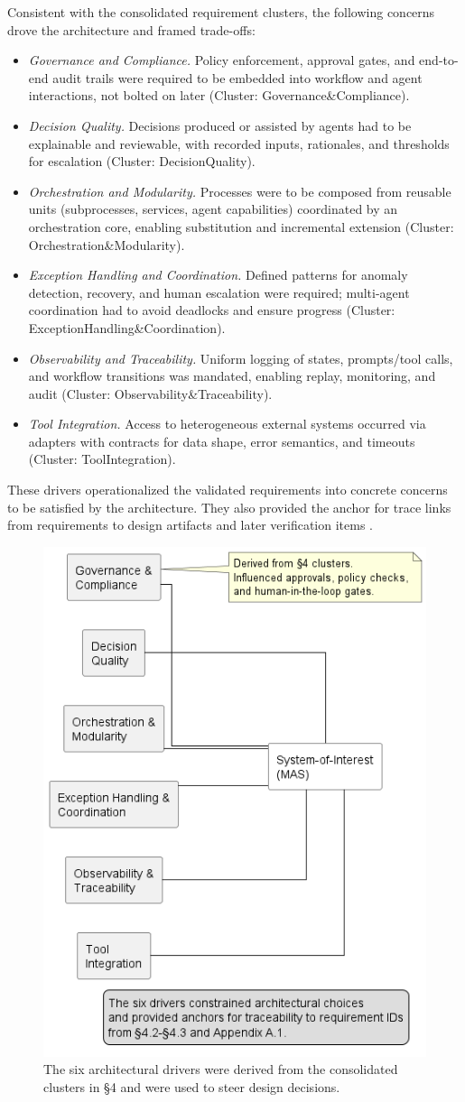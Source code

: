 Consistent with the consolidated requirement clusters, the following concerns drove the architecture and framed trade-offs:
\begin{itemize}
\item \emph{Governance and Compliance.} Policy enforcement, approval gates, and end-to-end audit trails were required to be embedded into workflow and agent interactions, not bolted on later (Cluster: Governance\&Compliance).
\item \emph{Decision Quality.} Decisions produced or assisted by agents had to be explainable and reviewable, with recorded inputs, rationales, and thresholds for escalation (Cluster: DecisionQuality).
\item \emph{Orchestration and Modularity.} Processes were to be composed from reusable units (subprocesses, services, agent capabilities) coordinated by an orchestration core, enabling substitution and incremental extension (Cluster: Orchestration\&Modularity).
\item \emph{Exception Handling and Coordination.} Defined patterns for anomaly detection, recovery, and human escalation were required; multi-agent coordination had to avoid deadlocks and ensure progress (Cluster: ExceptionHandling\&Coordination).
\item \emph{Observability and Traceability.} Uniform logging of states, prompts/tool calls, and workflow transitions was mandated, enabling replay, monitoring, and audit (Cluster: Observability\&Traceability).
\item \emph{Tool Integration.} Access to heterogeneous external systems occurred via adapters with contracts for data shape, error semantics, and timeouts (Cluster: ToolIntegration).
\end{itemize}
These drivers operationalized the validated requirements into concrete concerns to be satisfied by the architecture. They also provided the anchor for trace links from requirements to design artifacts and later verification items \parencite{IEEEStandard1990}.

\begin{figure}[t]
  \centering
  \includegraphics[width=0.5\linewidth]{ressources/MAS/figures/5_1b_drivers_overview.png}
  \caption{The six architectural drivers were derived from the consolidated clusters in §4 and were used to steer design decisions.}
  \label{fig:5.1b-drivers-overview}
\end{figure}

